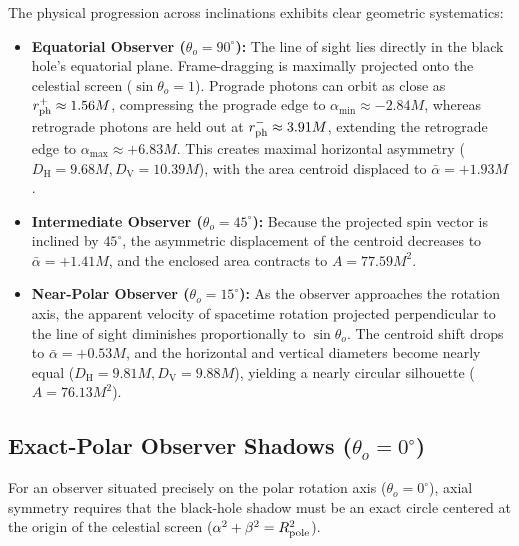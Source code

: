 The physical progression across inclinations exhibits clear geometric systematics:
\begin{itemize}
    \item \textbf{Equatorial Observer ($\theta_o = 90^\circ$):} The line of sight lies directly in the black hole's equatorial plane. Frame-dragging is maximally projected onto the celestial screen ($\sin\theta_o = 1$). Prograde photons can orbit as close as $r_{\rm ph}^+ \approx 1.56M$, compressing the prograde edge to $\alpha_{\min} \approx -2.84M$, whereas retrograde photons are held out at $r_{\rm ph}^- \approx 3.91M$, extending the retrograde edge to $\alpha_{\max} \approx +6.83M$. This creates maximal horizontal asymmetry ($D_{\mathrm{H}} = 9.68M, D_{\mathrm{V}} = 10.39M$), with the area centroid displaced to $\bar{\alpha} = +1.93M$.
    \item \textbf{Intermediate Observer ($\theta_o = 45^\circ$):} Because the projected spin vector is inclined by $45^\circ$, the asymmetric displacement of the centroid decreases to $\bar{\alpha} = +1.41M$, and the enclosed area contracts to $A = 77.59M^2$.
    \item \textbf{Near-Polar Observer ($\theta_o = 15^\circ$):} As the observer approaches the rotation axis, the apparent velocity of spacetime rotation projected perpendicular to the line of sight diminishes proportionally to $\sin\theta_o$. The centroid shift drops to $\bar{\alpha} = +0.53M$, and the horizontal and vertical diameters become nearly equal ($D_{\mathrm{H}} = 9.81M, D_{\mathrm{V}} = 9.88M$), yielding a nearly circular silhouette ($A = 76.13M^2$).
\end{itemize}

\subsection{Exact-Polar Observer Shadows ($\theta_o = 0^\circ$)}
\label{subsec:exact_polar_shadows}
For an observer situated precisely on the polar rotation axis ($\theta_o = 0^\circ$), axial symmetry requires that the black-hole shadow must be an exact circle centered at the origin of the celestial screen ($\alpha^2 + \beta^2 = R_{\rm pole}^2$).

